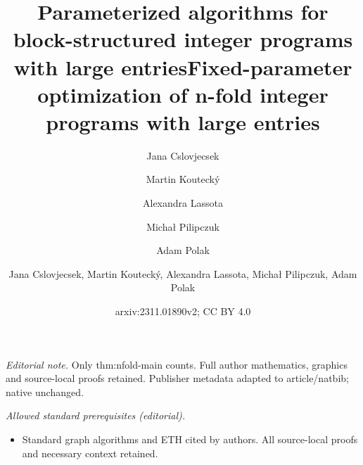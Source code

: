 \documentclass{article}
\author{Jana Cslovjecsek \and Martin Koutecký \and Alexandra Lassota \and Micha\l{} Pilipczuk \and Adam Polak}\date{}
\title{Parameterized algorithms for block-structured integer programs with large entries}
\title{Fixed-parameter optimization of n-fold integer programs with large entries}
\author{Jana Cslovjecsek, Martin Koutecký, Alexandra Lassota, Michał Pilipczuk, Adam Polak}
\date{arxiv:2311.01890v2; CC BY 4.0}
\begin{document}
\maketitle
\noindent\textit{Editorial note.} Only thm:nfold-main counts. Full author mathematics, graphics and source-local proofs retained. Publisher metadata adapted to article/natbib; native unchanged.\par\medskip
\noindent\textit{Allowed standard prerequisites (editorial).}\begin{itemize}
\item Standard graph algorithms and ETH cited by authors. All source-local proofs and necessary context retained.
\end{itemize}\medskip
\maketitle

\end{document}
